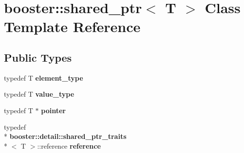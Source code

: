 \section{booster\-:\-:shared\-\_\-ptr$<$ T $>$ Class Template Reference}
\label{classbooster_1_1shared__ptr}
\subsection*{Public Types}
\begin{DoxyCompactItemize}
\item 
typedef T {\bfseries element\-\_\-type}\label{classbooster_1_1shared__ptr_a39185bbbcb2b45c05078b172aba40d18}

\item 
typedef T {\bfseries value\-\_\-type}\label{classbooster_1_1shared__ptr_a4e47f9bb1d99914dae9c423decd5b212}

\item 
typedef T $\ast$ {\bfseries pointer}\label{classbooster_1_1shared__ptr_aacdf919530faee7137bd7316c09b7858}

\item 
typedef \\*
{\bf booster\-::detail\-::shared\-\_\-ptr\-\_\-traits}\\*
$<$ T $>$\-::reference {\bfseries reference}\label{classbooster_1_1shared__ptr_af6612466646e048e063db10122e48099}

\end{DoxyCompactItemize}
